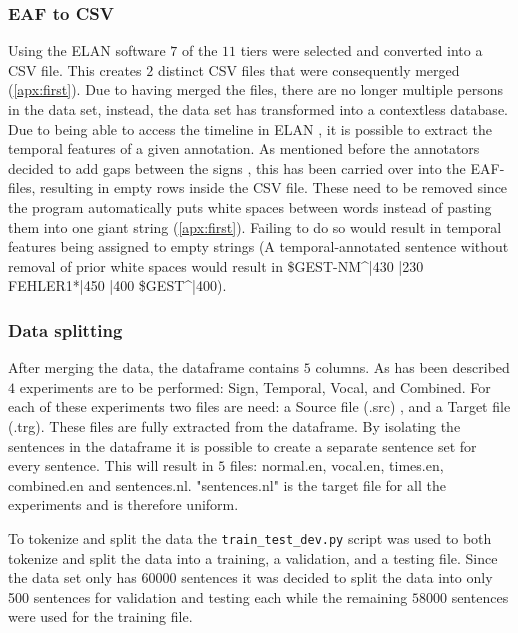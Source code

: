 \subsubsection{EAF to CSV}
Using the ELAN software $7$ of the $11$ tiers were selected and converted into a CSV file. This creates $2$ distinct CSV files that were consequently merged (\autoref{apx:first}). Due to having merged the files, there are no longer multiple persons in the data set, instead, the data set has transformed into a contextless database. Due to being able to access the timeline in ELAN \cite{elan_software}, it is possible to extract the temporal features of a given annotation. As mentioned before the annotators decided to add gaps between the signs \cite{hankesegmentation} \cite{konradoffentliches}, this has been carried over into the EAF-files, resulting in empty rows inside the CSV file. These need to be removed since the program automatically puts white spaces between words instead of pasting them into one giant string (\autoref{apx:first}). Failing to do so would result in temporal features being assigned to empty strings (A temporal-annotated sentence without removal of prior white spaces would result in \$GEST-NM\textasciicircum|430 |230 FEHLER1*|450 |400 \$GEST\textasciicircum|400).

\subsubsection{Data splitting}

After merging the data, the dataframe contains $5$ columns. As has been described $4$ experiments are to be performed: Sign, Temporal, Vocal, and Combined. For each of these experiments two files are need: a Source file (.src) , and a Target file (.trg). These files are fully extracted from the dataframe. By isolating the sentences in the dataframe it is possible to create a separate sentence set for every sentence. This will result in $5$ files: normal.en, vocal.en, times.en, combined.en and sentences.nl. "sentences.nl" is the target file for all the experiments and is therefore uniform.

To tokenize and split the data the \texttt{train\_test\_dev.py} \cite{dimitarshterionovtrain} script was used to both tokenize and split the data into a training, a validation, and a testing file. Since the data set only has $60000$ sentences it was decided to split the data into only 500 sentences for validation and testing each while the remaining $58000$ sentences were used for the training file.

